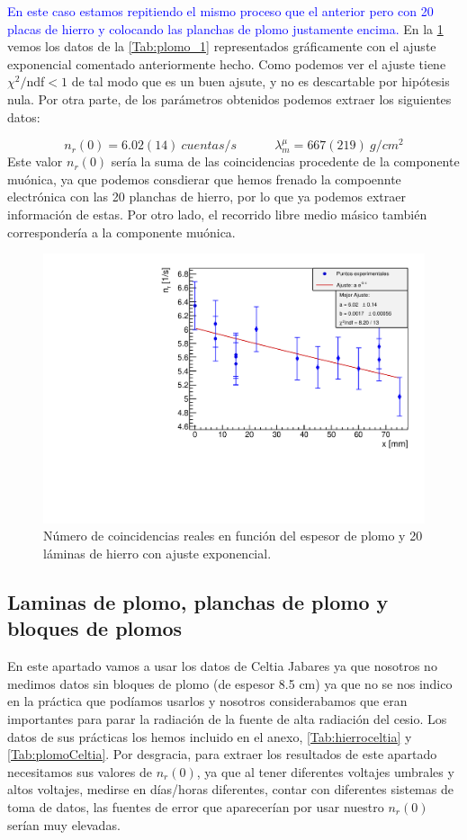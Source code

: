 \documentclass[11pt]{article}
\newcommand{\tquad}{\quad \quad \quad}
\begin{document}
\textcolor{blue}{En este caso estamos repitiendo el mismo proceso que el anterior pero con 20 placas de hierro y colocando las planchas de plomo justamente encima.} En la \cref{Fig:plomohierro} vemos los datos de la \cref{Tab:plomo_1} representados gráficamente con el ajuste exponencial comentado anteriormente hecho. Como podemos ver el ajuste tiene $\chi^2/$ndf$<1$ de tal modo que es un buen ajsute, y no es descartable por hipótesis nula. Por otra parte, de los parámetros obtenidos podemos extraer los siguientes datos: 

\begin{equation}
	n_r(0) = 6.02(14) \ \unit{cuentas/s}  \tquad \lambda^\mu_m = 667(219) \ \unit{g/cm^2}
\end{equation}
Este valor $n_r(0)$ sería la suma de las coincidencias procedente de la componente muónica, ya que podemos consdierar que hemos frenado la compoennte electrónica con las 20 planchas de hierro, por lo que ya podemos extraer información de estas. Por otro lado, el recorrido libre medio másico también correspondería a la componente muónica. 


\begin{figure}[h!] \centering	
	\caption{Número de coincidencias reales en función del espesor de plomo y 20 láminas de hierro con ajuste exponencial.}
	\label{Fig:plomohierro}
	\includegraphics[width=0.72\linewidth]{../Graficas/Plomo.pdf}
\end{figure}

\subsection{Laminas de plomo, planchas de plomo y bloques de plomos}

En este apartado vamos a usar los datos de Celtia Jabares ya que nosotros no medimos datos sin bloques de plomo (de espesor 8.5 cm) ya que no se nos indico en la práctica que podíamos usarlos y nosotros considerabamos que eran importantes para parar la radiación de la fuente de alta radiación del cesio. Los datos de sus prácticas los hemos incluido en el anexo, \cref{Tab:hierroceltia} y \cref{Tab:plomoCeltia}. Por desgracia, para extraer los resultados de este apartado necesitamos sus valores de $n_r(0)$, ya que al tener diferentes voltajes umbrales y altos voltajes, medirse en días/horas diferentes, contar con diferentes sistemas de toma de datos, las fuentes de error que aparecerían por usar nuestro $n_r(0)$ serían muy elevadas. 
\end{document}
